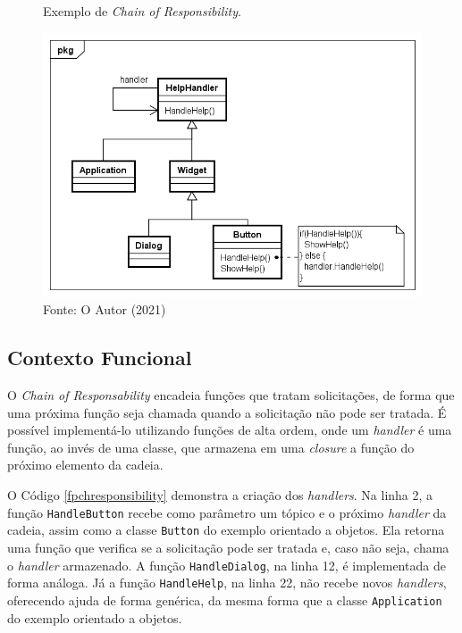 \begin{figure}[htb]
	\caption{\label{chain_exemplo}Exemplo de \textit{Chain of Responsibility}.}
	\begin{center}
	    \includegraphics[scale=0.5]{5_padroes-contexto-funcional/5.3_comportamentais/5.3.01_chain-of-responsibility/chainofresponsibility_exemplo.png}
	\end{center}
  \caption*{Fonte: O Autor (2021)}
\end{figure}

\subsection*{Contexto Funcional}

O \textit{Chain of Responsability} encadeia funções que 
tratam solicitações, de forma que uma próxima 
função seja chamada quando a solicitação não 
pode ser tratada. É possível implementá-lo 
utilizando funções de alta ordem, onde um 
\textit{handler} é uma função, ao invés de 
uma classe, que armazena em uma \textit{closure} 
a função do próximo elemento da cadeia. 

O Código \ref{fpchresponsibility} demonstra a 
criação dos \textit{handlers}. Na linha 2, a 
função \texttt{HandleButton} recebe como parâmetro um 
tópico e o próximo \textit{handler} da cadeia, 
assim como a classe \texttt{Button} do exemplo orientado 
a objetos. Ela retorna uma função que verifica 
se a solicitação pode ser tratada e, caso 
não seja, chama o \textit{handler} armazenado. 
A função \texttt{HandleDialog}, na linha 12, é 
implementada de forma análoga. Já a função 
\texttt{HandleHelp}, na linha 22, não recebe novos 
\textit{handlers}, oferecendo ajuda de forma 
genérica, da mesma forma que a classe 
\texttt{Application} do exemplo orientado a objetos.

